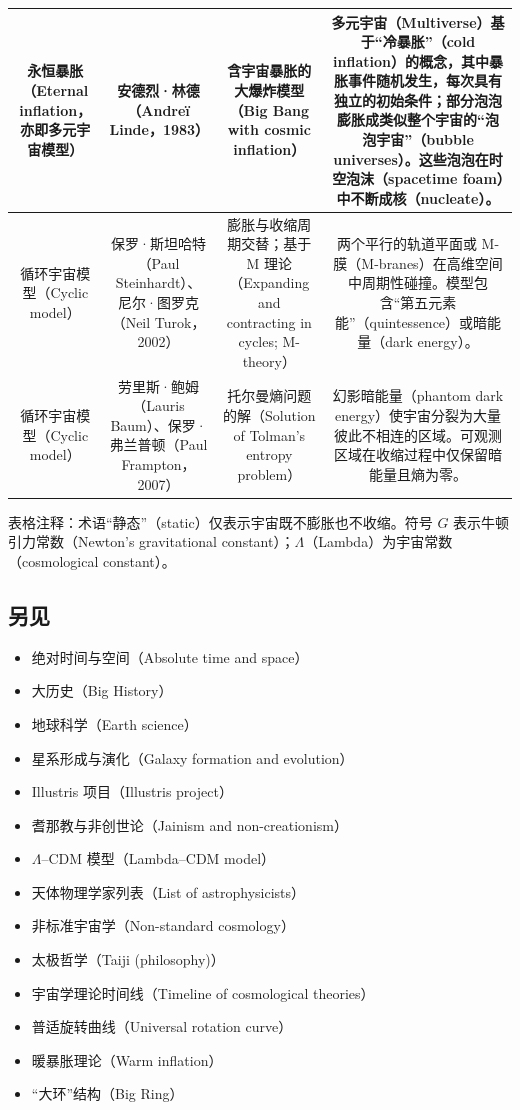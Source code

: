 \begin{table}[ht]
\begin{tabular}{|c|c|c|c|}
\hline
永恒暴胀（Eternal inflation，亦即多元宇宙模型）& 安德烈·林德（Andreï Linde，1983）& 含宇宙暴胀的大爆炸模型（Big Bang with cosmic inflation）& 多元宇宙（Multiverse）基于“冷暴胀”（cold inflation）的概念，其中暴胀事件随机发生，每次具有独立的初始条件；部分泡泡膨胀成类似整个宇宙的“泡泡宇宙”（bubble universes）。这些泡泡在时空泡沫（spacetime foam）中不断成核（nucleate）。\\
\hline
循环宇宙模型（Cyclic model）& 保罗·斯坦哈特（Paul Steinhardt）、尼尔·图罗克（Neil Turok，2002）& 膨胀与收缩周期交替；基于 M 理论（Expanding and contracting in cycles; M-theory）& 两个平行的轨道平面或 M-膜（M-branes）在高维空间中周期性碰撞。模型包含“第五元素能”（quintessence）或暗能量（dark energy）。\\
\hline
循环宇宙模型（Cyclic model）& 劳里斯·鲍姆（Lauris Baum）、保罗·弗兰普顿（Paul Frampton，2007）& 托尔曼熵问题的解（Solution of Tolman’s entropy problem）& 幻影暗能量（phantom dark energy）使宇宙分裂为大量彼此不相连的区域。可观测区域在收缩过程中仅保留暗能量且熵为零。\\
\hline
\end{tabular}
\end{table}
表格注释：术语“静态”（static）仅表示宇宙既不膨胀也不收缩。符号 $G$ 表示牛顿引力常数（Newton's gravitational constant）；$\Lambda$（Lambda）为宇宙常数（cosmological constant）。
\subsection{另见 } 
\begin{itemize}
\item 绝对时间与空间（Absolute time and space）  
\item 大历史（Big History）  
\item 地球科学（Earth science）  
\item 星系形成与演化（Galaxy formation and evolution）  
\item Illustris 项目（Illustris project）  
\item 耆那教与非创世论（Jainism and non-creationism）  
\item $\Lambda$–CDM 模型（Lambda–CDM model）  
\item 天体物理学家列表（List of astrophysicists）  
\item 非标准宇宙学（Non-standard cosmology）  
\item 太极哲学（Taiji (philosophy)）  
\item 宇宙学理论时间线（Timeline of cosmological theories）  
\item 普适旋转曲线（Universal rotation curve）  
\item 暖暴胀理论（Warm inflation）  
\item “大环”结构（Big Ring）
\end{itemize}


